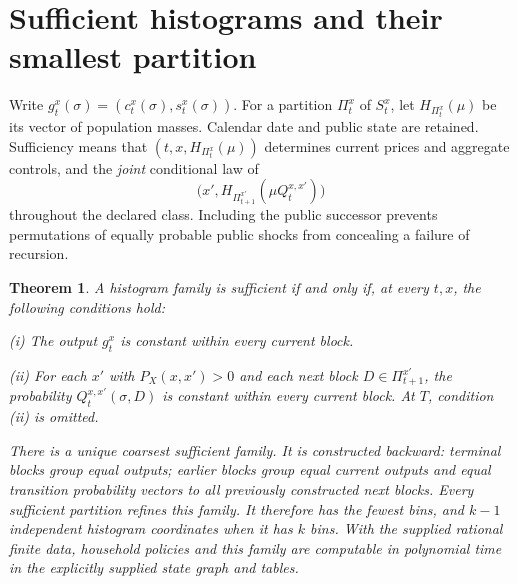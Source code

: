 \documentclass[11pt]{article}
\newtheorem{theorem}{Theorem}
\begin{document}
\section{Sufficient histograms and their smallest partition}
Write $g_t^x(\sigma)=(c_t^x(\sigma),s_t^x(\sigma))$. For a partition $\Pi_t^x$ of $S_t^x$, let $H_{\Pi_t^x}(\mu)$ be its vector of population masses. Calendar date and public state are retained. Sufficiency means that $(t,x,H_{\Pi_t^x}(\mu))$ determines current prices and aggregate controls, and the \emph{joint} conditional law of
\[
 \bigl(x',H_{\Pi_{t+1}^{x'}}(\mu Q_t^{x,x'})\bigr)
\]
throughout the declared class. Including the public successor prevents permutations of equally probable public shocks from concealing a failure of recursion.

\begin{theorem}\label{histograms}
A histogram family is sufficient if and only if, at every $t,x$, the following conditions hold:

\smallskip\noindent
(i) The output $g_t^x$ is constant within every current block.

\smallskip\noindent
(ii) For each $x'$ with $P_X(x,x')>0$ and each next block $D\in\Pi_{t+1}^{x'}$, the probability
$Q_t^{x,x'}(\sigma,D)$ is constant within every current block. At $T$, condition (ii) is omitted.

\smallskip\noindent
There is a unique coarsest sufficient family. It is constructed backward: terminal blocks group equal outputs; earlier blocks group equal current outputs and equal transition probability vectors to all previously constructed next blocks. Every sufficient partition refines this family. It therefore has the fewest bins, and $k-1$ independent histogram coordinates when it has $k$ bins. With the supplied rational finite data, household policies and this family are computable in polynomial time in the explicitly supplied state graph and tables.
\end{theorem}
\end{document}
